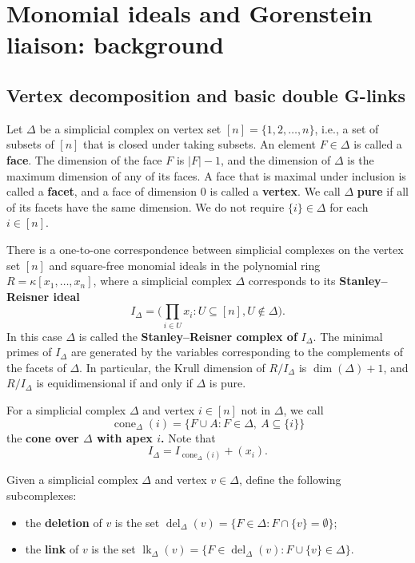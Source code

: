 \documentclass[12pt, reqno]{amsart}
\numberwithin{equation}{section}
\newtheorem{Main Conjecture}[theorem]{Main Conjecture}
\theoremstyle{definition}
\theoremstyle{plain}
\DeclareMathOperator{\lk}{lk}
\DeclareMathOperator{\del}{del}
\DeclareMathOperator{\cone}{cone}
\begin{document}
\section{Monomial ideals and Gorenstein liaison: background}
\label{sec:background}

\subsection{Vertex decomposition and basic double G-links}\label{s:vertex-decomposition}

 Let $\Delta$ be a simplicial complex on vertex set $[n] = \{1,2,\dots, n\}$, i.e., a set of subsets of $[n]$ that is closed under taking subsets. An element $F \in \Delta$ is called a \textbf{face}.  The dimension of the face $F$ is $|F|-1$, and the dimension of $\Delta$ is the maximum dimension of any of its faces.  A face that is maximal under inclusion is called a \textbf{facet}, and a face of dimension $0$ is called a \textbf{vertex}.  We call $\Delta$ \textbf{pure} if all of its facets have the same dimension. We do not require $\{i\} \in \Delta$ for each $i \in [n]$.
 
There is a one-to-one correspondence between simplicial complexes on the vertex set $[n]$ and square-free monomial ideals in the polynomial ring $R= \kappa[x_1, \ldots, x_n]$, where  a simplicial complex $\Delta$
 corresponds to its {\bf Stanley--Reisner ideal} $$I_\Delta = \Big (\prod_{i \in U} x_i: U \subseteq [n], U \notin \Delta \Big ).$$  In this case $\Delta$ is called the {\bf Stanley--Reisner complex of} $I_\Delta$.  The minimal primes of $I_\Delta$ are generated by the variables corresponding to the complements of the facets of $\Delta$.  In particular, the Krull dimension of $R/I_{\Delta}$ is $\dim(\Delta)+1$, and $R/I_\Delta$ is equidimensional if and only if $\Delta$ is pure.  

For a simplicial complex $\Delta$ and vertex $i\in [n]$ not in  $\Delta$, we call $$\cone_\Delta(i)=\{F \cup A : F \in \Delta, \ A\subseteq \{i\}\}$$ 
the \textbf{cone over $\Delta$ with apex $i$.} Note that $$I_\Delta = I_{\cone_\Delta(i)}+(x_i).$$
 
Given a simplicial complex $\Delta$ and vertex $v\in \Delta$, define the following subcomplexes:
\begin{itemize}
\item the {\bf deletion} of $v$ is the set $\del_{\Delta}(v) = \{F\in \Delta: F\cap \{v\} = \emptyset\}$; 
\item the {\bf link} of $v$ is the set $\lk_{\Delta}(v) = \{F\in \del_{\Delta}(v): F\cup\{v\}\in \Delta\}$.
\end{itemize}
\end{document}

